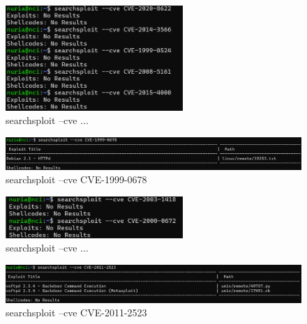 \documentclass[a4paper,12pt]{article} %
\begin{document}
\newpage
            \begin{figure} [hp!]
             \centering
             \includegraphics[width=0.6\textwidth]{imagenes/cvelinux18.png}
             \caption{ searchsploit --cve ...}
             \label{fig:linux18}
            \end{figure}

            \begin{figure} [hp!]
             \centering
             \includegraphics[width=1\textwidth]{imagenes/cvelinux19.png}
             \caption{ searchsploit --cve CVE-1999-0678}
             \label{fig:linux19}
            \end{figure}

            \begin{figure} [hp!]
             \centering
             \includegraphics[width=0.6\textwidth]{imagenes/cvelinux20.png}
             \caption{ searchsploit --cve ...}
             \label{fig:linux20}
            \end{figure}

            \begin{figure} [hp!]
             \centering
             \includegraphics[width=1\textwidth]{imagenes/cvelinux21.png}
             \caption{ searchsploit --cve CVE-2011-2523}
             \label{fig:linux21}
            \end{figure}
\end{document}
